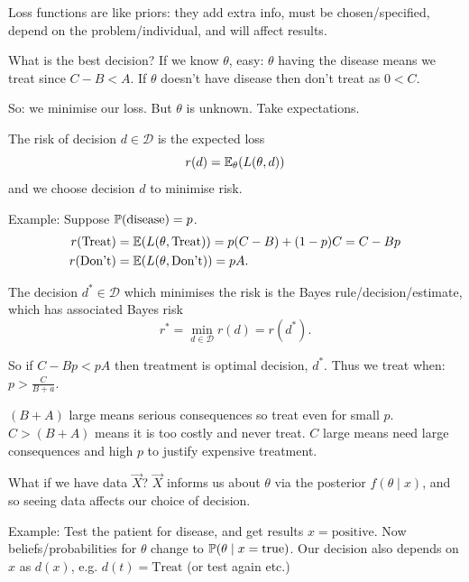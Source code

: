 \documentclass[10pt, a4paper]{article}
\begin{document}
Loss functions are like priors:
they add extra info,
must be chosen/specified,
depend on the problem/individual,
and will affect results.

What is the best decision?
If we know $\theta$,
easy:
$\theta$ having the disease means we treat since $C - B  < A$.
If $\theta$ doesn't have disease then don't treat as $0 < C$.

So:
we minimise our loss.
But $\theta$ is unknown.
Take expectations.

\begin{definition}
    The risk of decision $d \in \mathcal{D}$ is the expected loss
    \[
    r(d) = \E_{\theta}(L(\theta, d))
    \]
    and we choose decision $d$ to minimise risk.
\end{definition}

Example:
Suppose $\P(\text{disease}) = p$.
\begin{align*}
    r(\text{Treat}) &= \E(L(\theta, \text{Treat})) = p(C - B) + (1 - p)C = C - Bp \\
    r(\text{Don't}) &= \E(L(\theta, \text{Don't})) = pA.
\end{align*}

\begin{definition}
    The decision $d ^ {*} \in \mathcal{D}$ which minimises the risk is the Bayes rule/decision/estimate,
    which has associated Bayes risk
    \[
    r ^ {*} = \min_{d \in \mathcal{D}}r(d) = r(d ^ {*}).
    \]
\end{definition}

\begin{example}
    So if $C - Bp < pA$ then treatment is optimal decision,
    $d ^ {*}$.
    Thus we treat when:
    $p > \frac{C}{B + a}$.

    $(B + A)$ large means serious consequences so treat even for small $p$.
    $C > (B + A)$ means it is too costly and never treat.
    $C$ large means need large consequences and high $p$ to justify expensive treatment.
\end{example}

What if we have data $\vec{X}$?
$\vec{X}$ informs us about $\theta$ via the posterior $f(\theta \mid x)$,
and so seeing data affects our choice of decision.

Example:
Test the patient for disease,
and get results $x = \text{positive}$.
Now beliefs/probabilities for $\theta$ change to $\P(\theta \mid x = \text{true})$.
Our decision also depends on $x$ as $d(x)$,
e.g.
$d(t) = \text{Treat}$
(or test again etc.)
\end{document}

